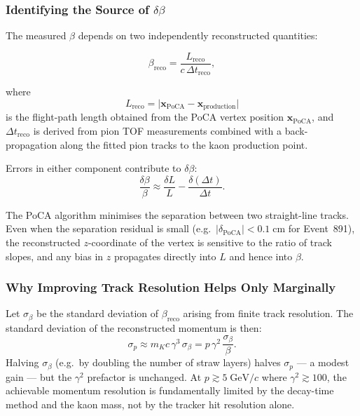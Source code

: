 \subsubsection{Identifying the Source of $\delta\beta$}

The measured $\beta$ depends on two independently reconstructed quantities:

\begin{equation}
  \beta_{\text{reco}} = \frac{L_{\text{reco}}}{c\,\Delta t_{\text{reco}}},
  \label{eq:beta_components}
\end{equation}

where
\begin{equation}
  L_{\text{reco}} = \bigl|\bm{x}_{\text{PoCA}} - \bm{x}_{\text{production}}\bigr|
  \label{eq:L_reco}
\end{equation}
is the flight-path length obtained from the PoCA vertex position $\bm{x}_{\text{PoCA}}$,
and $\Delta t_{\text{reco}}$ is derived from pion TOF measurements combined with
a back-propagation along the fitted pion tracks to the kaon production point.

Errors in either component contribute to $\delta\beta$:
\begin{equation}
  \frac{\delta\beta}{\beta} \approx \frac{\delta L}{L} - \frac{\delta(\Delta t)}{\Delta t}.
  \label{eq:beta_error_decomp}
\end{equation}

The PoCA algorithm minimises the separation between two straight-line tracks.
Even when the separation residual is small (e.g.\ $|\delta_{\text{PoCA}}| < 0.1\;\text{cm}$
for Event~891), the reconstructed $z$-coordinate of the vertex is sensitive to the
ratio of track slopes, and any bias in $z$ propagates directly into $L$ and hence
into $\beta$.

\subsubsection{Why Improving Track Resolution Helps Only Marginally}

Let $\sigma_\beta$ be the standard deviation of $\beta_{\text{reco}}$ arising from
finite track resolution.  The standard deviation of the reconstructed momentum is then:
\begin{equation}
  \sigma_p \approx m_K c\,\gamma^3\,\sigma_\beta
             = p\,\gamma^2\,\frac{\sigma_\beta}{\beta}.
  \label{eq:sigma_p}
\end{equation}
Halving $\sigma_\beta$ (e.g.\ by doubling the number of straw layers) halves
$\sigma_p$ — a modest gain — but the $\gamma^2$ prefactor is unchanged.  At
$p \gtrsim 5\;\text{GeV}/c$ where $\gamma^2 \gtrsim 100$, the achievable momentum
resolution is fundamentally limited by the decay-time method and the kaon mass, not
by the tracker hit resolution alone.

